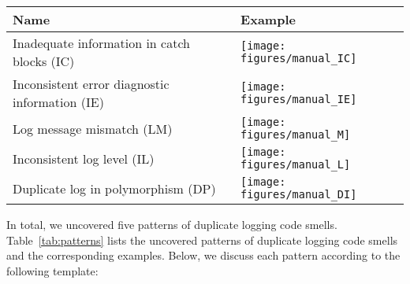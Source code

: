 \begin{table*}
\caption{Patterns of duplicate logging code smells 
and corresponding examples.} %
\centering

\begin{tabular}{m{} | m{}  }%
\toprule
\textbf{Name} & \textbf{Example} \\
\midrule
Inadequate information in catch blocks (IC) & 
\texttt{[image: figures/manual\_IC]}

\\
\midrule
Inconsistent error diagnostic information (IE) & \texttt{[image: figures/manual\_IE]}
\\
\midrule
Log message mismatch (LM) & \texttt{[image: figures/manual\_M]}
\\

\midrule
Inconsistent log level (IL) & \texttt{[image: figures/manual\_L]}
\\


\midrule
Duplicate log in polymorphism  (DP) & \texttt{[image: figures/manual\_DI]}
\\


\bottomrule
\end{tabular}
\label{tab:patterns}
\end{table*}

 In total, we uncovered five patterns of duplicate logging code smells. Table~\ref{tab:patterns} lists the uncovered patterns of duplicate logging code smells and the corresponding examples. Below, we discuss each pattern according to the following template: 



